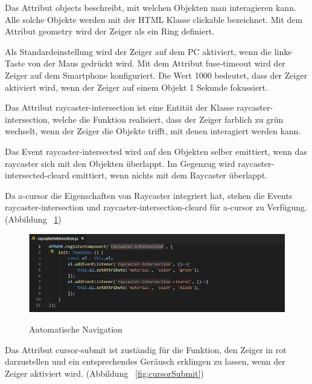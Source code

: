   Das Attribut {\selectfont objects} beschreibt, mit welchen Objekten man interagieren kann. Alle solche Objekte werden mit der HTML Klasse {\selectfont clickable} bezeichnet. Mit dem Attribut {\selectfont geometry} wird der Zeiger als ein Ring definiert.
  
  Als Standardeinstellung wird der Zeiger auf dem PC aktiviert, wenn die linke Taste von der Maus gedrückt wird. Mit dem Attribut {\selectfont fuse-timeout} wird der Zeiger auf dem Smartphone konfiguriert. Die Wert 1000 bedeutet, dass der Zeiger aktiviert wird, wenn der Zeiger auf einem Objekt 1 Sekunde fokussiert.
  
  Das Attribut {\selectfont raycaster-intersection} ist eine Entität der Klasse {\selectfont raycaster-intersection}, welche die Funktion realisiert, dass der Zeiger farblich zu grün wechselt, wenn der Zeiger die Objekte trifft, mit denen interagiert werden kann.
  
  Das Event {\selectfont raycaster-intersected} wird auf den Objekten selber emittiert, wenn das raycaster sich mit den Objekten überlappt. Im Gegenzug wird {\selectfont raycaster-intersected-cleard} emittiert, wenn nichts mit dem Raycaster überlappt.
  
  Da {\selectfont a-cursor} die Eigenschaften von Raycaster integriert hat, stehen die Events {\selectfont raycaster-intersection} und {\selectfont raycaster-intersection-cleard} für {\selectfont a-cursor} zu Verfügung. (Abbildung ~\ref{fig:raycasterIntersection})
  
\begin{figure}[ht]
\vspace*{1em}
\centering
\caption[Automatische Navigation]{Automatische Navigation}
\includegraphics[width=\textwidth]{images/raycasterIntersection.png}
\label{fig:raycasterIntersection} 
\end{figure}
  
  Das Attribut {\selectfont cursor-submit} ist zuständig für die Funktion, den Zeiger in rot darzustellen und ein entsprechendes Geräusch erklingen zu lassen, wenn der Zeiger aktiviert wird. (Abbildung ~\ref{fig:cursorSubmit})
  
